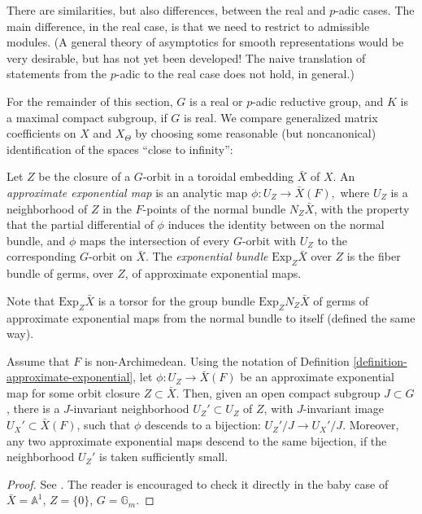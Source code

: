 There are similarities, but also differences, between the real and $p$-adic cases. The main difference, in the real case, is that we need to restrict to admissible modules. (A general theory of asymptotics for smooth representations would be very desirable, but has not yet been developed! The naive translation of statements from the $p$-adic to the real case does not hold, in general.)

For the remainder of this section, $G$ is a real or $p$-adic reductive group, and $K$ is a maximal compact subgroup, if $G$ is real. We compare generalized matrix coefficients on $X$ and $X_\Theta$ by choosing some reasonable (but noncanonical) identification of the spaces ``close to infinity'':

\begin{definition}
 \label{definition-approximate-exponential}
Let $Z$ be the closure of a $G$-orbit in a toroidal embedding $\bar X$ of $X$. An {\it approximate exponential map} is an analytic map $\phi: U_Z\to \bar X(F),$ where $U_Z$ is a neighborhood of $Z$ in the $F$-points of the normal bundle $N_Z \bar X$,  with the property that the partial differential of $\phi$ induces the identity between on the normal bundle, and $\phi$ maps the intersection of every $G$-orbit with $U_Z$ to the corresponding $G$-orbit on $\bar X$. The {\it exponential bundle} $\text{Exp}_Z \bar X$ over $Z$ is the fiber bundle of germs, over $Z$, of approximate exponential maps. 
\end{definition}

Note that $\text{Exp}_Z \bar X$ is a torsor for the group bundle $\text{Exp}_Z N_Z\bar X$ of germs of approximate exponential maps from the normal bundle to itself (defined the same way). 

\begin{proposition}
 \label{proposition-exponential-p-adic}
Assume that $F$ is non-Archimedean. Using the notation of Definition \ref{definition-approximate-exponential}, let $\phi: U_Z \to \bar X(F)$ be an approximate exponential map for some orbit closure $Z\subset \bar X$.  
Then, given an open compact subgroup $J\subset G$, there is a $J$-invariant neighborhood $U_Z'\subset U_Z$ of $Z$, with $J$-invariant image $U_X'\subset \bar X(F)$, such that $\phi$ descends to a bijection: $U_Z'/J\to U_X'/J$. Moreover, any two approximate exponential maps descend to the same bijection, if the neighborhood $U_Z'$ is taken sufficiently small.
\end{proposition}

\begin{proof}
 See \cite[Proposition 4.3.1]{Sakellaridis-Venkatesh}. The reader is encouraged to check it directly in the baby case of $\bar X=\mathbb A^1$, $Z=\{0\}$, $G=\mathbb G_m$.
\end{proof}

